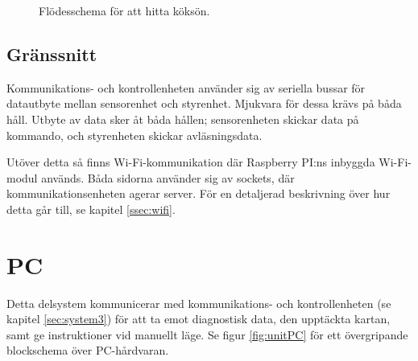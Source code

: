 \documentclass[a4paper,11pt]{article}
\begin{document}
\begin{figure}[h!]
    \caption{Flödesschema för att hitta köksön. \label{fig:kitchenDrive}}
\end{figure}

\subsection{Gränssnitt} \label{ssec:brainInterface}
Kommunikations- och kontrollenheten använder sig av seriella bussar för datautbyte mellan sensorenhet och styrenhet. Mjukvara för dessa krävs på båda håll. Utbyte av data sker åt båda hållen; sensorenheten skickar data på kommando, och styrenheten skickar avläsningsdata.

Utöver detta så finns Wi-Fi-kommunikation där Raspberry PI:ns inbyggda Wi-Fi-modul används. Båda sidorna använder sig av sockets, där kommunikationsenheten agerar server. För en detaljerad beskrivning över hur detta går till, se kapitel \ref{ssec:wifi}.

\clearpage
\section{PC} 
\label{sec:system4}
Detta delsystem kommunicerar med kommunikations- och kontrollenheten (se kapitel \ref{sec:system3}) för att ta emot diagnostisk data, den upptäckta kartan, samt ge instruktioner vid manuellt läge. Se figur \ref{fig:unitPC} för ett övergripande blockschema över PC-hårdvaran.
\end{document}
